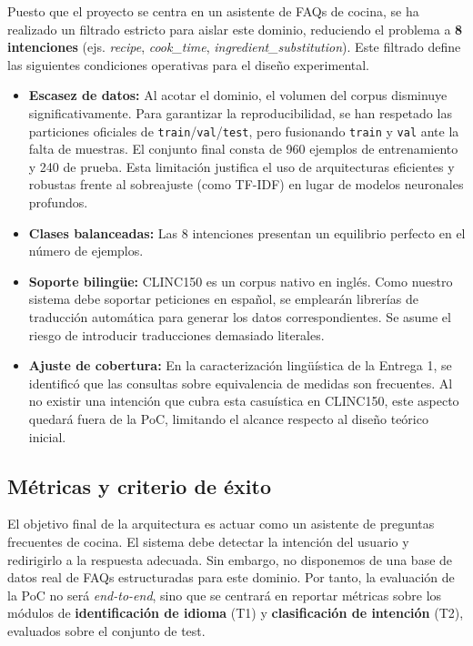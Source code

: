 \documentclass[11pt,a4paper,twoside]{article}
\theoremstyle{definition}
\numberwithin{equation}{section}
\begin{document}
Puesto que el proyecto se centra en un asistente de FAQs de cocina, se ha realizado un filtrado estricto para aislar este dominio, reduciendo el problema a \textbf{8 intenciones} (ejs. \textit{recipe}, \textit{cook\_time}, \textit{ingredient\_substitution}). Este filtrado define las siguientes condiciones operativas para el diseño experimental.
\begin{itemize}
	\item \textbf{Escasez de datos:} Al acotar el dominio, el volumen del corpus disminuye significativamente. Para garantizar la reproducibilidad, se han respetado las particiones oficiales de \texttt{train}/\texttt{val}/\texttt{test}, pero fusionando \texttt{train} y \texttt{val} ante la falta de muestras. El conjunto final consta de 960 ejemplos de entrenamiento y 240 de prueba. Esta limitación justifica el uso de arquitecturas eficientes y robustas frente al sobreajuste (como TF-IDF) en lugar de modelos neuronales profundos.
	\item \textbf{Clases balanceadas:} Las 8 intenciones presentan un equilibrio perfecto en el número de ejemplos.
	\item \textbf{Soporte bilingüe:} CLINC150 es un corpus nativo en inglés. Como nuestro sistema debe soportar peticiones en español, se emplearán librerías de traducción automática para generar los datos correspondientes. Se asume el riesgo de introducir traducciones demasiado literales.
	\item \textbf{Ajuste de cobertura:} En la caracterización lingüística de la Entrega 1, se identificó que las consultas sobre equivalencia de medidas son frecuentes. Al no existir una intención que cubra esta casuística en CLINC150, este aspecto quedará fuera de la PoC, limitando el alcance respecto al diseño teórico inicial. 
\end{itemize}

\subsection{Métricas y criterio de éxito}
El objetivo final de la arquitectura es actuar como un asistente de preguntas frecuentes de cocina. El sistema debe detectar la intención del usuario y redirigirlo a la respuesta adecuada. Sin embargo, no disponemos de una base de datos real de FAQs estructuradas para este dominio. Por tanto, la evaluación de la PoC no será \textit{end-to-end}, sino que se centrará en reportar métricas sobre los módulos de \textbf{identificación de idioma} (T1) y \textbf{clasificación de intención} (T2), evaluados sobre el conjunto de test.
\end{document}
